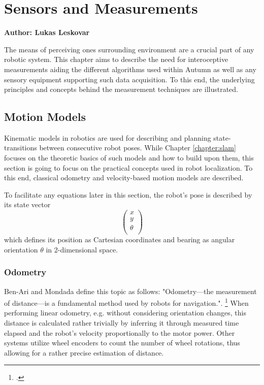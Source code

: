 \chapter{Sensors and Measurements}\label{chapter:sensors}

\textbf{Author: Lukas Leskovar} 

The means of perceiving ones surrounding environment are a crucial part of any robotic system. This chapter aims to describe the need for interoceptive measurements aiding the different algorithms used within Autumn as well as any sensory equipment supporting such data acquisition. To this end, the underlying principles and concepts behind the measurement techniques are illustrated.

\section{Motion Models}
Kinematic models in robotics are used for describing and planning state-transitions between consecutive robot poses. While Chapter \ref{chapter:slam} focuses on the theoretic basics of such models and how to build upon them, this section is going to focus on the practical concepts used in robot localization. To this end, classical odometry and velocity-based motion models are described.

To facilitate any equations later in this section, the robot's pose is described by its state vector 
\[
\begin{pmatrix}
	x \\
	y \\
	\theta \\
\end{pmatrix}
\] 
which defines its position as Cartesian coordinates and bearing as angular orientation $\theta$ in 2-dimensional space. 

\subsection{Odometry}
Ben-Ari and Mondada define this topic as follows: "Odometry—the measurement of distance—is a fundamental method used by robots for navigation.". \footcite[Page 69]{ben2017elements} 
When performing linear odometry, e.g. without considering orientation changes, this distance is calculated rather trivially by inferring it through measured time elapsed and the robot's velocity proportionally to the motor power. 
Other systems utilize wheel encoders to count the number of wheel rotations, thus allowing for a rather precise estimation of distance. 

